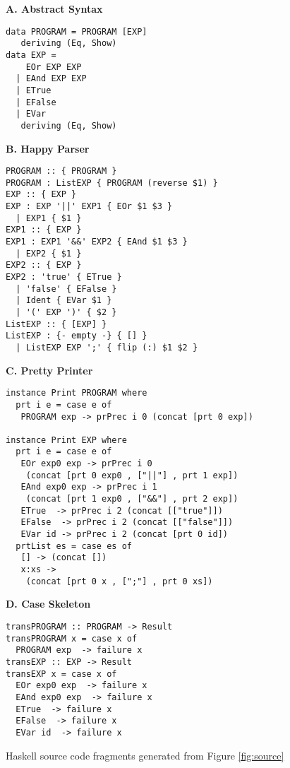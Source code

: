 \begin{figure}
\begin{boxedminipage}[t]{\textwidth}
\begin{minipage}[l]{0.5\textwidth}

\textbf{A. Abstract Syntax}
\scriptsize
\begin{verbatim}
data PROGRAM = PROGRAM [EXP]
   deriving (Eq, Show)
data EXP =
    EOr EXP EXP
  | EAnd EXP EXP
  | ETrue
  | EFalse
  | EVar
   deriving (Eq, Show)
\end{verbatim}
\normalsize
\textbf{B. Happy Parser}

\scriptsize
\begin{verbatim}
PROGRAM :: { PROGRAM }
PROGRAM : ListEXP { PROGRAM (reverse $1) }
EXP :: { EXP }
EXP : EXP '||' EXP1 { EOr $1 $3 }
  | EXP1 { $1 }
EXP1 :: { EXP }
EXP1 : EXP1 '&&' EXP2 { EAnd $1 $3 }
  | EXP2 { $1 }
EXP2 :: { EXP }
EXP2 : 'true' { ETrue }
  | 'false' { EFalse }
  | Ident { EVar $1 }
  | '(' EXP ')' { $2 }
ListEXP :: { [EXP] }
ListEXP : {- empty -} { [] }
  | ListEXP EXP ';' { flip (:) $1 $2 }
\end{verbatim}
\normalsize
\end{minipage}
\hfill
\begin{minipage}[r]{0.5\textwidth}

\textbf{C. Pretty Printer}

\scriptsize
\begin{verbatim}
instance Print PROGRAM where
  prt i e = case e of
   PROGRAM exp -> prPrec i 0 (concat [prt 0 exp])

instance Print EXP where
  prt i e = case e of
   EOr exp0 exp -> prPrec i 0
    (concat [prt 0 exp0 , ["||"] , prt 1 exp])
   EAnd exp0 exp -> prPrec i 1
    (concat [prt 1 exp0 , ["&&"] , prt 2 exp])
   ETrue  -> prPrec i 2 (concat [["true"]])
   EFalse  -> prPrec i 2 (concat [["false"]])
   EVar id -> prPrec i 2 (concat [prt 0 id])
  prtList es = case es of
   [] -> (concat [])
   x:xs ->
    (concat [prt 0 x , [";"] , prt 0 xs])
\end{verbatim}
\normalsize

\textbf{D. Case Skeleton}

\scriptsize
\begin{verbatim}
transPROGRAM :: PROGRAM -> Result
transPROGRAM x = case x of
  PROGRAM exp  -> failure x
transEXP :: EXP -> Result
transEXP x = case x of
  EOr exp0 exp  -> failure x
  EAnd exp0 exp  -> failure x
  ETrue  -> failure x
  EFalse  -> failure x
  EVar id  -> failure x
\end{verbatim}
\hfill
\end{minipage}
\end{boxedminipage}
\caption{Haskell source code fragments generated from Figure \ref{fig:source}}
\label{fig:haskell}
\end{figure}
